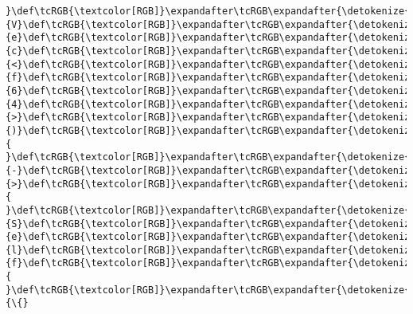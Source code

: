 \documentclass[11pt]{article}
\begin{document}
\begin{Verbatim}[commandchars=\\\{\}, frame=single, framerule=2mm, rulecolor=\color{outerrorbackground}]
}\def\tcRGB{\textcolor[RGB]}\expandafter\tcRGB\expandafter{\detokenize{95,0,135}}{V}\def\tcRGB{\textcolor[RGB]}\expandafter\tcRGB\expandafter{\detokenize{95,0,135}}{e}\def\tcRGB{\textcolor[RGB]}\expandafter\tcRGB\expandafter{\detokenize{95,0,135}}{c}\def\tcRGB{\textcolor[RGB]}\expandafter\tcRGB\expandafter{\detokenize{95,0,135}}{<}\def\tcRGB{\textcolor[RGB]}\expandafter\tcRGB\expandafter{\detokenize{95,0,135}}{f}\def\tcRGB{\textcolor[RGB]}\expandafter\tcRGB\expandafter{\detokenize{95,0,135}}{6}\def\tcRGB{\textcolor[RGB]}\expandafter\tcRGB\expandafter{\detokenize{95,0,135}}{4}\def\tcRGB{\textcolor[RGB]}\expandafter\tcRGB\expandafter{\detokenize{95,0,135}}{>}\def\tcRGB{\textcolor[RGB]}\expandafter\tcRGB\expandafter{\detokenize{95,0,135}}{)}\def\tcRGB{\textcolor[RGB]}\expandafter\tcRGB\expandafter{\detokenize{95,0,135}}{ }\def\tcRGB{\textcolor[RGB]}\expandafter\tcRGB\expandafter{\detokenize{95,0,135}}{-}\def\tcRGB{\textcolor[RGB]}\expandafter\tcRGB\expandafter{\detokenize{95,0,135}}{>}\def\tcRGB{\textcolor[RGB]}\expandafter\tcRGB\expandafter{\detokenize{95,0,135}}{ }\def\tcRGB{\textcolor[RGB]}\expandafter\tcRGB\expandafter{\detokenize{95,0,135}}{S}\def\tcRGB{\textcolor[RGB]}\expandafter\tcRGB\expandafter{\detokenize{95,0,135}}{e}\def\tcRGB{\textcolor[RGB]}\expandafter\tcRGB\expandafter{\detokenize{95,0,135}}{l}\def\tcRGB{\textcolor[RGB]}\expandafter\tcRGB\expandafter{\detokenize{95,0,135}}{f}\def\tcRGB{\textcolor[RGB]}\expandafter\tcRGB\expandafter{\detokenize{178,178,178}}{ }\def\tcRGB{\textcolor[RGB]}\expandafter\tcRGB\expandafter{\detokenize{178,178,178}}{\{}

\end{Verbatim}
\end{document}
